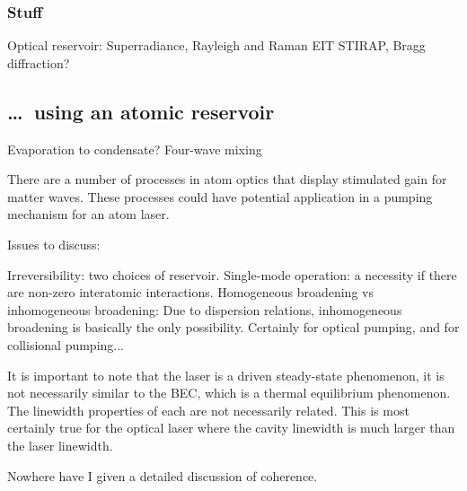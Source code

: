 \subsubsection{Stuff}
Optical reservoir:
Superradiance, Rayleigh and Raman
EIT
STIRAP, Bragg diffraction?

\subsection{\dots\ using an atomic reservoir}
Evaporation to condensate?
Four-wave mixing


There are a number of processes in atom optics that display stimulated gain for matter waves.  These processes could have potential application in a pumping mechanism for an atom laser.

Issues to discuss:

Irreversibility: two choices of reservoir.
Single-mode operation: a necessity if there are non-zero interatomic interactions.
Homogeneous broadening vs inhomogeneous broadening: Due to dispersion relations, inhomogeneous broadening is basically the only possibility.  Certainly for optical pumping, and for collisional pumping...

It is important to note that the laser is a driven steady-state phenomenon, it is not necessarily similar to the BEC, which is a thermal equilibrium phenomenon.  The linewidth properties of each are not necessarily related.  This is most certainly true for the optical laser where the cavity linewidth is much larger than the laser linewidth.  

Nowhere have I given a detailed discussion of coherence.


